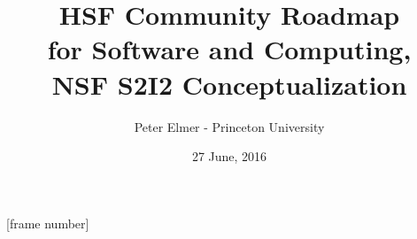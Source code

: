 \documentclass{beamer}
\title{HSF Community Roadmap \\
       for Software and Computing, \\
       NSF S2I2 Conceptualization}
\author{Peter Elmer - Princeton University}
\date{27 June, 2016}
\begin{document}
\maketitle

%
%

[frame number]








%
















%

%


\end{document}
